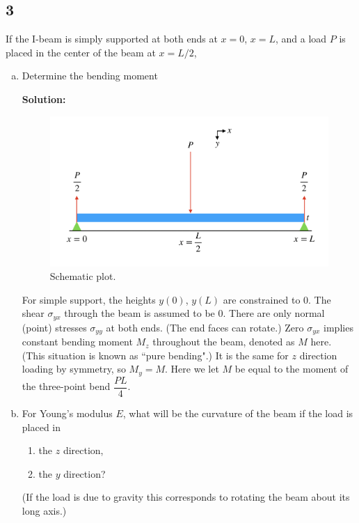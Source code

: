 \documentclass[12pt]{article}
\begin{document}
\subsection{3}
If the I-beam is simply supported at both ends at $x=0$, $x=L$, and a load $P$ is placed in the center of the beam at $x=L/2$,
\begin{enumerate}[(a)]
	\item Determine the bending moment

	      \textbf{Solution:}
	      \begin{figure}[h]
		      \centering
		      \includegraphics[width=0.6\linewidth]{images/support}
		      \caption{Schematic plot.}
		      \label{fig:support}
	      \end{figure}
	      For simple support, the heights $y(0)$, $y(L)$ are constrained to $0$.
	      The shear $\sigma_{yx}$ through the beam is assumed to be $0$.
	      There are only normal (point) stresses $\sigma_{yy}$ at both ends. (The end faces can rotate.)
	      Zero $\sigma_{yx}$ implies constant bending moment $M_z$ throughout the beam, denoted as
	      $M$ here. (This situation is known as ``pure bending".)
	      It is the same for $z$ direction loading by symmetry, so $M_y = M$.
	      Here we let $M$ be equal to the moment of the three-point bend $\dfrac{ P L }{ 4 }$.

	\item For Young's modulus $E$, what will be the curvature of the beam if the load is placed in
	      \begin{enumerate}[(b1)]
		      \item the $z$ direction,
		      \item the $y$ direction?
	      \end{enumerate}
	      (If the load is due to gravity this corresponds to rotating the beam about its long axis.)


\end{enumerate}
\end{document}
